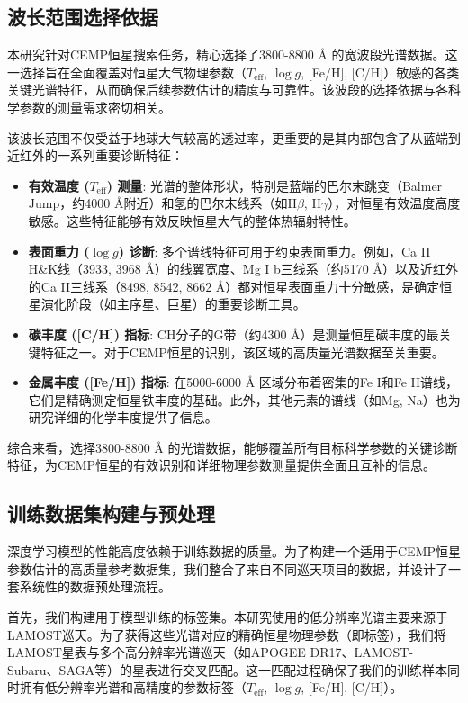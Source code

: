 \subsection{波长范围选择依据}

本研究针对CEMP恒星搜索任务，精心选择了3800-8800 Å 的宽波段光谱数据。这一选择旨在全面覆盖对恒星大气物理参数（$T_{\text{eff}}$, $\log g$, [Fe/H], [C/H]）敏感的各类关键光谱特征，从而确保后续参数估计的精度与可靠性。该波段的选择依据与各科学参数的测量需求密切相关。

该波长范围不仅受益于地球大气较高的透过率，更重要的是其内部包含了从蓝端到近红外的一系列重要诊断特征：

\begin{itemize}
    \item \textbf{有效温度 ($T_{\text{eff}}$) 测量}: 光谱的整体形状，特别是蓝端的巴尔末跳变（Balmer Jump，约4000 Å附近）和氢的巴尔末线系（如H$\beta$, H$\gamma$），对恒星有效温度高度敏感。这些特征能够有效反映恒星大气的整体热辐射特性。
    \item \textbf{表面重力 ($\log g$) 诊断}: 多个谱线特征可用于约束表面重力。例如，Ca II H\&K线（3933, 3968 Å）的线翼宽度、Mg I b三线系（约5170 Å）以及近红外的Ca II三线系（8498, 8542, 8662 Å）都对恒星表面重力十分敏感，是确定恒星演化阶段（如主序星、巨星）的重要诊断工具。
    \item \textbf{碳丰度 ([C/H]) 指标}: CH分子的G带（约4300 Å）是测量恒星碳丰度的最关键特征之一。对于CEMP恒星的识别，该区域的高质量光谱数据至关重要。
    \item \textbf{金属丰度 ([Fe/H]) 指标}: 在5000-6000 Å 区域分布着密集的Fe I和Fe II谱线，它们是精确测定恒星铁丰度的基础。此外，其他元素的谱线（如Mg, Na）也为研究详细的化学丰度提供了信息。
\end{itemize}

综合来看，选择3800-8800 Å 的光谱数据，能够覆盖所有目标科学参数的关键诊断特征，为CEMP恒星的有效识别和详细物理参数测量提供全面且互补的信息。

\subsection{训练数据集构建与预处理}
\label{sec:data_preparation}
深度学习模型的性能高度依赖于训练数据的质量。为了构建一个适用于CEMP恒星参数估计的高质量参考数据集，我们整合了来自不同巡天项目的数据，并设计了一套系统性的数据预处理流程。

首先，我们构建用于模型训练的标签集。本研究使用的低分辨率光谱主要来源于LAMOST巡天。为了获得这些光谱对应的精确恒星物理参数（即标签），我们将LAMOST星表与多个高分辨率光谱巡天（如APOGEE DR17、LAMOST-Subaru、SAGA等）的星表进行交叉匹配。这一匹配过程确保了我们的训练样本同时拥有低分辨率光谱和高精度的参数标签（$T_{\text{eff}}$, $\log g$, [Fe/H], [C/H]）。

